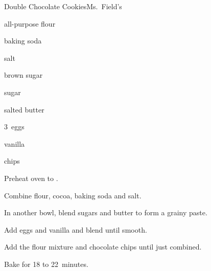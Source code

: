 \begin{recipe}{Double Chocolate Cookies}{Ms.~Field's}{}

\begin{ingredients}
\item \C{2\quarter} all-purpose flour
\item \C{\half} 
\item \tp{\half} baking soda
\item \tp{\quarter} salt
\item {} brown sugar
\item \C{\threequarter} sugar
\item {} salted butter
\item 3~eggs
\item {} vanilla
\item {}  chips
\end{ingredients}

\begin{directions}
\item Preheat oven to .
\item Combine flour, cocoa, baking soda and salt.
\item In  another bowl, blend sugars and butter to form a grainy paste.
\item Add eggs and vanilla and blend until smooth.
\item Add the flour mixture and chocolate chips until just combined.
\item Bake for 18 to 22~minutes.
\end{directions}
\end{recipe}

